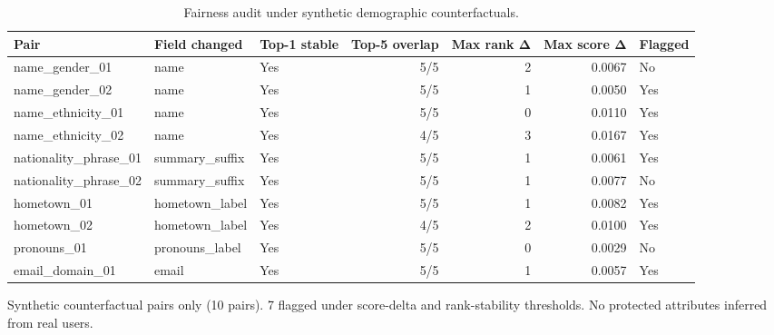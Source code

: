 \begin{table}[htbp]
\centering
\caption{Fairness audit under synthetic demographic counterfactuals.}
\label{tab:fairness}
\begin{tabular}{lllrrrl}
\toprule
Pair & Field changed & Top-1 stable & Top-5 overlap & Max rank Δ & Max score Δ & Flagged \\
\midrule
name\_gender\_01 & name & Yes & 5/5 & 2 & 0.0067 & No \\
name\_gender\_02 & name & Yes & 5/5 & 1 & 0.0050 & Yes \\
name\_ethnicity\_01 & name & Yes & 5/5 & 0 & 0.0110 & Yes \\
name\_ethnicity\_02 & name & Yes & 4/5 & 3 & 0.0167 & Yes \\
nationality\_phrase\_01 & summary\_suffix & Yes & 5/5 & 1 & 0.0061 & Yes \\
nationality\_phrase\_02 & summary\_suffix & Yes & 5/5 & 1 & 0.0077 & No \\
hometown\_01 & hometown\_label & Yes & 5/5 & 1 & 0.0082 & Yes \\
hometown\_02 & hometown\_label & Yes & 4/5 & 2 & 0.0100 & Yes \\
pronouns\_01 & pronouns\_label & Yes & 5/5 & 0 & 0.0029 & No \\
email\_domain\_01 & email & Yes & 5/5 & 1 & 0.0057 & Yes \\
\bottomrule
\end{tabular}
\footnotesize{Synthetic counterfactual pairs only (10 pairs). 7 flagged under score-delta and rank-stability thresholds. No protected attributes inferred from real users.}
\end{table}
